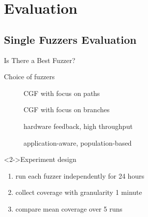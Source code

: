 \documentclass[\HandoutMode,table]{beamer}
\begin{document}
\section{Evaluation}

\subsection{Single Fuzzers Evaluation}

\begin{frame}
    {Is There a Best Fuzzer?}
    \begin{block}{Choice of fuzzers}
        \begin{description}
            \item[\aflfast] CGF with focus on paths
            \item[\fairfuzz] CGF with focus on branches
            \item[\honggfuzz] hardware feedback, high throughput
            \item[\vuzzer] application-aware, population-based
        \end{description}
    \end{block}
    \begin{block}<2->{Experiment design}
        \begin{enumerate}
            \item{} run each fuzzer independently for 24 hours
            \item{} collect coverage with granularity 1 minute
            \item{} compare mean coverage over 5 runs
        \end{enumerate}
    \end{block}
\end{frame}
\end{document}
